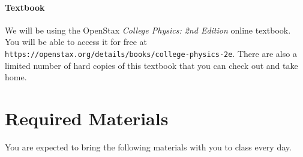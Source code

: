 \documentclass[10pt]{exam}
\begin{document}
\paragraph{Textbook} We will be using the OpenStax \textit{College Physics: 2nd Edition} online textbook.  You will be able to access it for free at \texttt{https://openstax.org/details/books/college-physics-2e}.  There are also a limited number of hard copies of this textbook that you can check out and take home.


\section*{Required Materials}

You are expected to bring the following materials with you to class every day.  

\begin{center}


\end{center}
\end{document}
